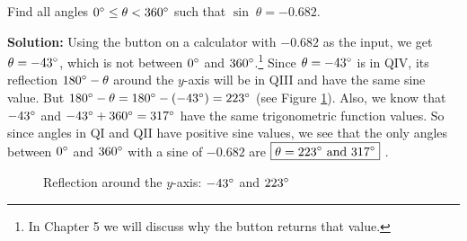 \begin{exmp}\label{exmp:sinneg0682}
 Find all angles $0^\circ \le \theta < 360^\circ$ such that $\sin\;\theta = -0.682$.\vspace{1mm}
 \par\noindent\textbf{Solution:} Using the
 {\setlength\fboxsep{1pt}} button
 on a calculator with $-0.682$ as the input, we get $\theta = -43^\circ$, which is not between
 $0^\circ$ and $360^\circ$.\footnote{In Chapter 5 we will discuss why the
 {\setlength\fboxsep{1pt}} button returns that value.} Since
 $\theta =
 -43^\circ$ is in QIV, its reflection $180^\circ - \theta$ around the $y$-axis will be in QIII
 and have the same sine value. But $180^\circ - \theta = 180^\circ - (-43^\circ) =
 223^\circ$ (see Figure \ref{fig:exmpnegsin}). Also, we know that
 $-43^\circ$ and $-43^\circ + 360^\circ = 317^\circ$ have the same trigonometric function
 values. So since angles in QI and QII have positive sine values, we see that the only angles
 between $0^\circ$ and $360^\circ$ with a sine of $-0.682$ are $\boxed{\theta =
 223^\circ ~\text{and}~ 317^\circ}~$.

\begin{figure}[h]
 \begin{center}
  \vspace{-5mm}
 \end{center}
 \caption[]{\quad Reflection around the $y$-axis: $-43^\circ$ and $223^\circ$}
 \label{fig:exmpnegsin}
\end{figure}
\end{exmp}
\divider
\newpage
\startexercises\label{sec1dot5}
